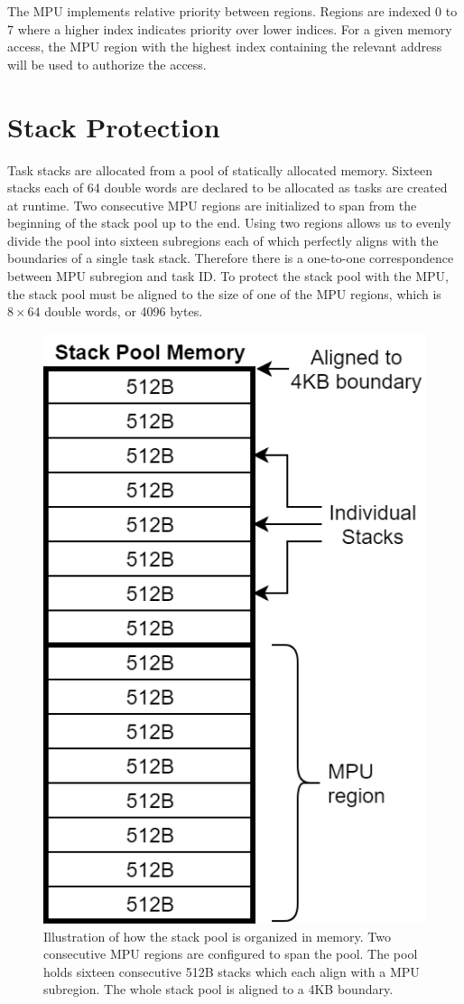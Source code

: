 The MPU implements relative priority between regions. Regions are indexed 0 to 7 where a higher index indicates priority over lower indices. For a given memory access, the MPU region with the highest index containing the relevant address will be used to authorize the access.

\section{Stack Protection}

Task stacks are allocated from a pool of statically allocated memory. Sixteen stacks each of 64 double words are declared to be allocated as tasks are created at runtime. Two consecutive MPU regions are initialized to span from the beginning of the stack pool up to the end. Using two regions allows us to evenly divide the pool into sixteen subregions each of which perfectly aligns with the boundaries of a single task stack. Therefore there is a one-to-one correspondence between MPU subregion and task ID. To protect the stack pool with the MPU, the stack pool must be aligned to the size of one of the MPU regions, which is $8\times64$ double words, or 4096 bytes.

\begin{figure}[hbtp]
	\centering
	\includegraphics[width=0.4\columnwidth]{figs/stack_prot.png}
	\caption{Illustration of how the stack pool is organized in memory. Two consecutive MPU regions are configured to span the pool. The pool holds sixteen consecutive 512B stacks which each align with a MPU subregion. The whole stack pool is aligned to a 4KB boundary.}
	\label{fig:stack_prot}
\end{figure}

